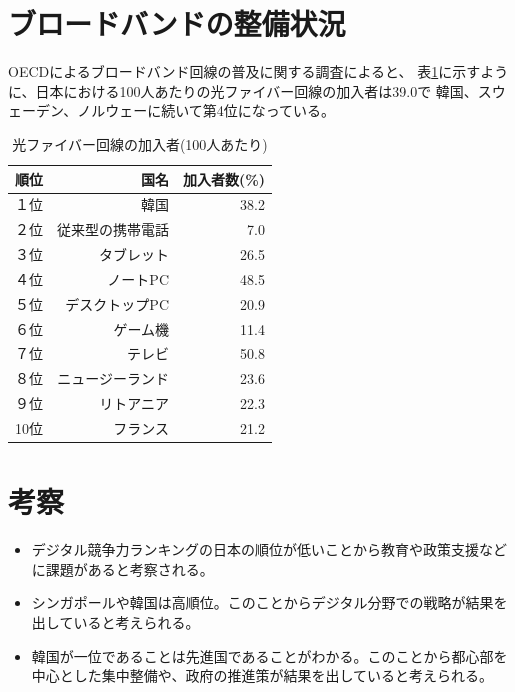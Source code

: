 \documentclass[a4paper,11pt,dvipdfmx]{ujarticle}
\begin{document}
\section{ブロードバンドの整備状況}
OECDによるブロードバンド回線の普及に関する調査\cite{oecd}によると、
表\ref{tbl:加入者数}に示すように、日本における100人あたりの光ファイバー回線の加入者は39.0で
韓国、スウェーデン、ノルウェーに続いて第4位になっている。
\begin{table}[http]
    \centering
    \caption{光ファイバー回線の加入者(100人あたり)}
    \label{tbl:加入者数}

    \begin{tabular}{|l|r|r|}\hline
        順位 & 国名 & 加入者数(\%) \\
        \hline
        １位 & 韓国 & 38.2 \\
        \hline
        ２位 & 従来型の携帯電話 & 7.0 \\
        \hline
        ３位 & タブレット & 26.5 \\
        \hline
        ４位 & ノートPC & 48.5 \\
        \hline
        ５位 & デスクトップPC & 20.9 \\
        \hline
        ６位 & ゲーム機 & 11.4 \\
        \hline 
        ７位 & テレビ & 50.8 \\
        \hline
        ８位 & ニュージーランド & 23.6 \\
        \hline
        ９位 & リトアニア & 22.3 \\
        \hline
        10位 & フランス & 21.2 \\
        \hline
    \end{tabular}
\end{table}
\section{考察}
\begin{itemize}
    \item デジタル競争力ランキングの日本の順位が低いことから教育や政策支援などに課題があると考察される。
    \item シンガポールや韓国は高順位。このことからデジタル分野での戦略が結果を出していると考えられる。
    \item 韓国が一位であることは先進国であることがわかる。このことから都心部を中心とした集中整備や、政府の推進策が結果を出していると考えられる。
\end{itemize}
%


\end{document}
